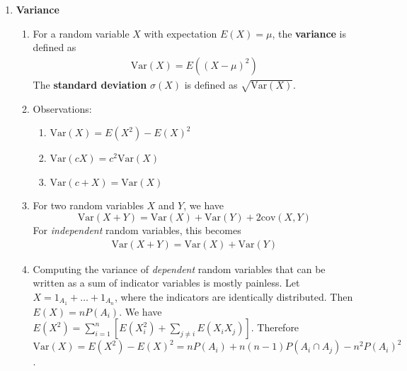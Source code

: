 \documentclass[10pt]{article}
\begin{document}
\begin{multicols}{2}
\begin{enumerate}
        \item \textbf{Variance} 
        \begin{enumerate}
            \item For a random variable $X$ with expectation $E(X)=\mu$, the \textbf{variance} is defined as
            \begin{align*}
                \text{Var}(X)=E\left( (X-\mu)^2\right)
            \end{align*}
            The \textbf{standard deviation} $\sigma(X)$ is defined as $\sqrt{\text{Var}(X)}$.
            \item Observations:
            \begin{enumerate}
                \item $\text{Var}(X)=E(X^2) - E(X)^2$
                \item $\text{Var}(cX)=c^2\text{Var}(X)$
                \item $\text{Var}(c+X)=\text{Var}(X)$
            \end{enumerate}
            \item For two random variables $X$ and $Y$, we have
            $$
                \text{Var}(X+Y)=\text{Var}(X)+\text{Var}(Y)+2\text{cov}(X,Y)
            $$
            For \textit{independent} random variables, this becomes
            \begin{align*}
                \text{Var}(X+Y)=\text{Var}(X) + \text{Var}(Y)
            \end{align*}
            \item Computing the variance of \textit{dependent} random variables that can be written as a sum of indicator variables is mostly painless. Let $X=1_{A_1}+\ldots+1_{A_n}$, where the indicators are identically distributed. Then $E(X)=nP(A_i)$. We have $E(X^2)=\sum_{i=1}^{n} [E(X_i^2)+\sum_{j \neq i} E(X_iX_j)]$. Therefore $\text{Var}(X)=E(X^2)-E(X)^2=nP(A_i)+n(n-1)P(A_i \cap A_j)-n^2P(A_i)^2$.
        \end{enumerate}
        
        \columnbreak
        

\end{enumerate}
\end{multicols}
\end{document}
